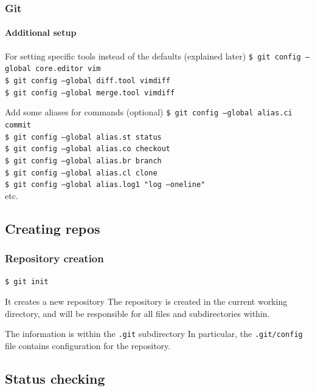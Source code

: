 \begin{frame}
\frametitle{Git}
\framesubtitle{Additional setup}

\begin{block}{For setting specific tools instead of the defaults (explained later)}
\texttt{\$ git config ---global core.editor vim} \\
\texttt{\$ git config ---global diff.tool vimdiff}  \\
\texttt{\$ git config ---global merge.tool vimdiff}
\end{block}

\pause
\begin{block}{Add some aliases for commands (optional)}
\texttt{\$ git config ---global alias.ci commit} \\
\texttt{\$ git config ---global alias.st status} \\
\texttt{\$ git config ---global alias.co checkout} \\
\texttt{\$ git config ---global alias.br branch} \\
\texttt{\$ git config ---global alias.cl clone} \\
\texttt{\$ git config ---global alias.log1 "log ---oneline"} \\
etc.
\end{block}
\end{frame}

\subsection{Creating repos}

\begin{frame}
\frametitle{Repository creation}

\texttt{\$ git init}

\bigskip
\begin{block}{It creates a new repository}
The repository is created in the current working directory, and will be responsible for all files and subdirectories within.
\end{block}
\begin{block}{The information is within the \texttt{.git} subdirectory}
In particular, the \texttt{.git/config} file contains configuration for the repository.
\end{block}
\end{frame}

\subsection{Status checking}

